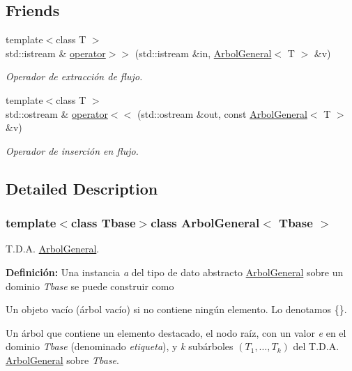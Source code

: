 \subsection*{Friends}
\begin{DoxyCompactItemize}
\item 
{\footnotesize template$<$class T $>$ }\\std\-::istream \& \hyperlink{classArbolGeneral_ab1318141f030856da7dcfc1c7a162565}{operator$>$$>$} (std\-::istream \&in, \hyperlink{classArbolGeneral}{Arbol\-General}$<$ T $>$ \&v)
\begin{DoxyCompactList}\small\item\em Operador de extracción de flujo. \end{DoxyCompactList}\item 
{\footnotesize template$<$class T $>$ }\\std\-::ostream \& \hyperlink{classArbolGeneral_a4e1153e673608d812c48de2a33bbead0}{operator$<$$<$} (std\-::ostream \&out, const \hyperlink{classArbolGeneral}{Arbol\-General}$<$ T $>$ \&v)
\begin{DoxyCompactList}\small\item\em Operador de inserción en flujo. \end{DoxyCompactList}\end{DoxyCompactItemize}


\subsection{Detailed Description}
\subsubsection*{template$<$class Tbase$>$class Arbol\-General$<$ Tbase $>$}

T.\-D.\-A. \hyperlink{classArbolGeneral}{Arbol\-General}. 

{\bfseries Definición\-:} Una instancia {\itshape a} del tipo de dato abstracto \hyperlink{classArbolGeneral}{Arbol\-General} sobre un dominio {\itshape Tbase} se puede construir como


\begin{DoxyItemize}
\item Un objeto vacío (árbol vacío) si no contiene ningún elemento. Lo denotamos \{\}.
\item Un árbol que contiene un elemento destacado, el nodo raíz, con un valor {\itshape e} en el dominio {\itshape Tbase} (denominado {\itshape etiqueta}), y {\itshape k} subárboles $(T_1, \ldots, T_k)$ del T.\-D.\-A. \hyperlink{classArbolGeneral}{Arbol\-General} sobre {\itshape Tbase}.
\end{DoxyItemize}

